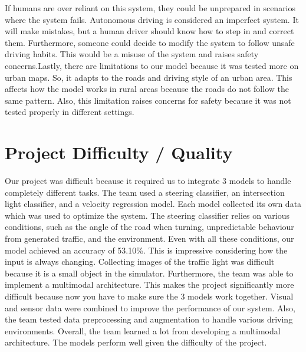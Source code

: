 \documentclass{article} %
\begin{document}
If humans are over reliant on this system, they could be unprepared in scenarios where the system fails.
Autonomous driving is considered an imperfect system. It will make mistakes, but a human driver should
know how to step in and correct them. Furthermore, someone could decide to modify the system to follow
unsafe driving habits. This would be a misuse of the system and raises safety concerns.Lastly, there are limitations to our model because it was tested more on urban maps. So, it adapts to the
roads and driving style of an urban area. This affects how the model works in rural areas because the roads
do not follow the same pattern. Also, this limitation raises concerns for safety because it was not tested
properly in different settings.


\section{Project Difficulty / Quality}

Our project was difficult because it required us to integrate 3 models to handle completely different
tasks. The team used a steering classifier, an intersection light classifier, and a velocity regression
model. Each model collected its own data which was used to optimize the system. The steering classifier
relies on various conditions, such as the angle of the road when turning, unpredictable behaviour from
generated traffic, and the environment. Even with all these conditions, our model achieved an accuracy
of 53.10\%. This is impressive considering how the input is always changing. Collecting images of the traffic light was difficult because it is a small object in the simulator.
Furthermore, the team was able to implement a multimodal architecture. This makes the project
significantly more difficult because now you have to make sure the 3 models work together. Visual and
sensor data were combined to improve the performance of our system. Also, the team tested data
preprocessing and augmentation to handle various driving environments. Overall, the team learned a lot from developing a multimodal architecture. The models perform well given
the difficulty of the project.



\label{last_page}



\end{document}
